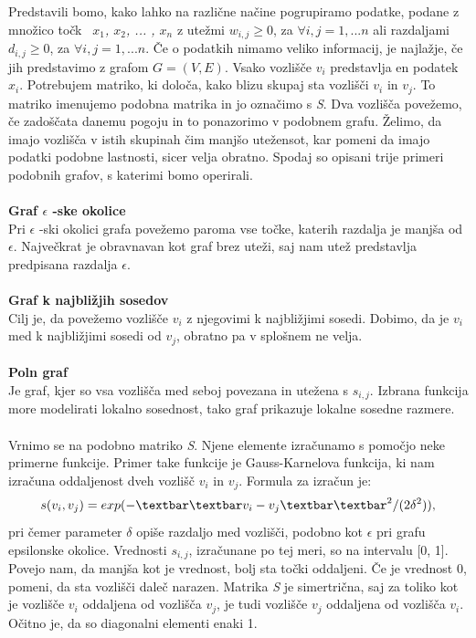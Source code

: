 \documentclass[a4paper, 10pt]{article}
\begin{document}
Predstavili bomo, kako lahko na različne načine pogrupiramo podatke, podane z množico točk \textsl{\ $x_1$, $x_2$, ... , $x_n$ } z utežmi $w_{i,j} \geq 0$, za $\forall i,j = 1, ... n$ ali razdaljami $d_{i,j} \geq 0$, za $\forall i,j = 1, ... n$. Če o podatkih nimamo veliko informacij, je najlažje, če jih predstavimo z grafom $G=(V, E)$. Vsako vozlišče $v_i$ predstavlja en podatek \textsl{$x_i$}. Potrebujem matriko, ki določa, kako blizu skupaj sta vozlišči $v_i$ in $v_j$. To matriko imenujemo podobna matrika in jo označimo s \textsl{S}. Dva vozlišča povežemo, če zadoščata danemu pogoju in to ponazorimo v podobnem grafu. Želimo, da imajo vozlišča v istih skupinah čim manjšo utežensot, kar pomeni da imajo podatki podobne lastnosti, sicer velja obratno. Spodaj so opisani trije primeri podobnih grafov, s katerimi bomo operirali.\\
\\
\textbf{Graf $\epsilon$ -ske okolice}\\
Pri $\epsilon$ -ski okolici grafa povežemo paroma vse točke, katerih razdalja je manjša od $\epsilon$. Največkrat je obravnavan kot graf brez uteži, saj nam utež predstavlja predpisana razdalja $\epsilon$.\\
\\
\textbf{Graf k najbližjih sosedov}\\
Cilj je, da povežemo vozlišče $v_i$ z njegovimi k najbližjimi sosedi. Dobimo, da je $v_i$ med k najbližjimi sosedi od $v_j$, obratno pa v splošnem ne velja.\\
\\
\textbf{Poln graf}\\
Je graf, kjer so vsa vozlišča med seboj povezana in utežena s $s_{i,j}$. Izbrana funkcija more modelirati lokalno sosednost, tako graf prikazuje lokalne sosedne razmere.\\
\\
Vrnimo se na podobno matriko \textsl{S}. Njene elemente izračunamo s pomočjo neke primerne funkcije. Primer take funkcije je Gauss-Karnelova funkcija, ki nam izračuna oddaljenost dveh vozlišč $v_i$ in $v_j$. Formula za izračun je:$$s(v_i, v_j) = exp(-\textbar\textbar v_i - v_j \textbar\textbar^2 / (2\delta^2)),$$pri čemer parameter $\delta$ opiše razdaljo med vozlišči, podobno kot $\epsilon$ pri grafu epsilonske okolice.  Vrednosti $s_{i,j}$, izračunane po tej meri, so na intervalu [0, 1]. Povejo nam, da manjša kot je vrednost, bolj sta točki oddaljeni. Če je vrednost 0, pomeni, da sta vozlišči daleč narazen. Matrika \textsl{S} je simertrična, saj za toliko kot je vozlišče $v_i$ oddaljena od vozlišča $v_j$, je tudi vozlišče $v_j$ oddaljena od vozlišča $v_i$. Očitno je, da so diagonalni elementi enaki 1.\\
\end{document}
